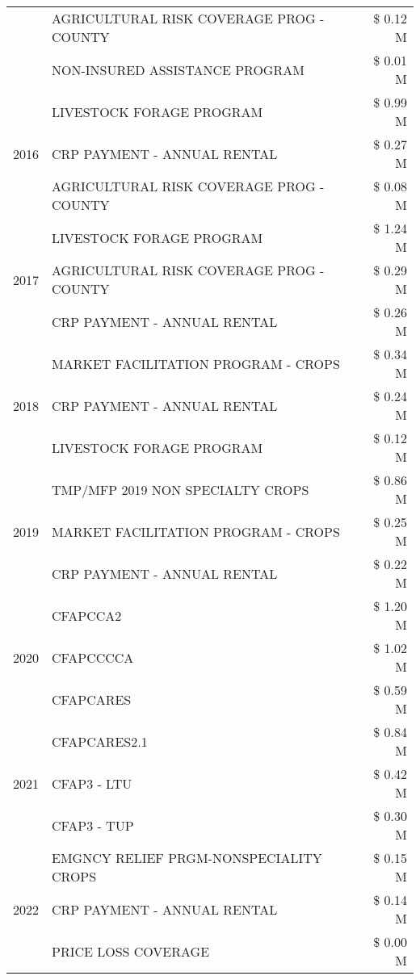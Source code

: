 \begin{tabular}{llr}
 & AGRICULTURAL RISK COVERAGE PROG - COUNTY & \$ 0.12 M \\
 & NON-INSURED ASSISTANCE PROGRAM & \$ 0.01 M \\
\cline{1-3}
\multirow[t]{3}{*}{2016} & LIVESTOCK FORAGE PROGRAM & \$ 0.99 M \\
 & CRP PAYMENT - ANNUAL RENTAL & \$ 0.27 M \\
 & AGRICULTURAL RISK COVERAGE PROG - COUNTY & \$ 0.08 M \\
\cline{1-3}
\multirow[t]{3}{*}{2017} & LIVESTOCK FORAGE PROGRAM & \$ 1.24 M \\
 & AGRICULTURAL RISK COVERAGE PROG - COUNTY & \$ 0.29 M \\
 & CRP PAYMENT - ANNUAL RENTAL & \$ 0.26 M \\
\cline{1-3}
\multirow[t]{3}{*}{2018} & MARKET FACILITATION PROGRAM - CROPS & \$ 0.34 M \\
 & CRP PAYMENT - ANNUAL RENTAL & \$ 0.24 M \\
 & LIVESTOCK FORAGE PROGRAM & \$ 0.12 M \\
\cline{1-3}
\multirow[t]{3}{*}{2019} & TMP/MFP 2019 NON SPECIALTY CROPS & \$ 0.86 M \\
 & MARKET FACILITATION PROGRAM - CROPS & \$ 0.25 M \\
 & CRP PAYMENT - ANNUAL RENTAL & \$ 0.22 M \\
\cline{1-3}
\multirow[t]{3}{*}{2020} & CFAPCCA2 & \$ 1.20 M \\
 & CFAPCCCCA & \$ 1.02 M \\
 & CFAPCARES & \$ 0.59 M \\
\cline{1-3}
\multirow[t]{3}{*}{2021} & CFAPCARES2.1 & \$ 0.84 M \\
 & CFAP3 - LTU & \$ 0.42 M \\
 & CFAP3 - TUP & \$ 0.30 M \\
\cline{1-3}
\multirow[t]{3}{*}{2022} & EMGNCY RELIEF PRGM-NONSPECIALITY CROPS & \$ 0.15 M \\
 & CRP PAYMENT - ANNUAL RENTAL & \$ 0.14 M \\
 & PRICE LOSS COVERAGE & \$ 0.00 M \\
\cline{1-3}
\bottomrule
\end{tabular}
